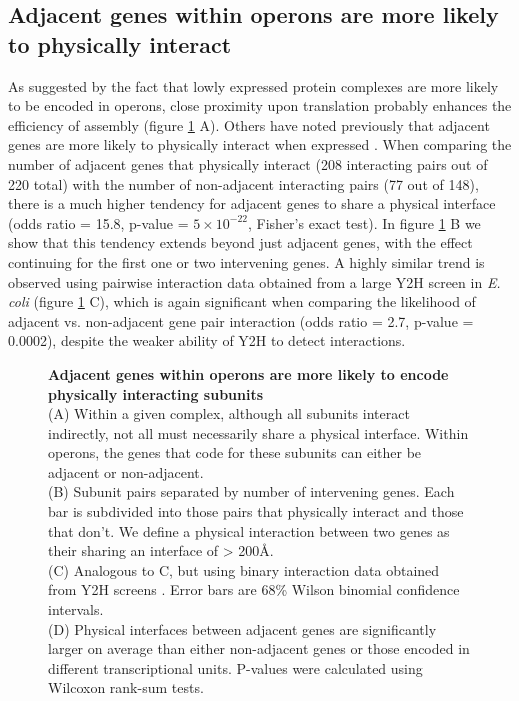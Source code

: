 \documentclass[a4paper,11pt,twoside,openright]{scrbook}
\begin{document}
\subsection{Adjacent genes within operons are more likely to physically interact}
As suggested by the fact that lowly expressed protein complexes are more likely to be encoded in operons, close proximity upon translation probably enhances the efficiency of assembly (figure \ref{figure:intervening} A). Others have noted previously that adjacent genes are more likely to physically interact when expressed \cite{}. When comparing the number of adjacent genes that physically interact (208 interacting pairs out of 220 total) with the number of non-adjacent interacting pairs (77 out of 148), there is a much higher tendency for adjacent genes to share a physical interface (odds ratio = 15.8, p-value = \(5\times10^{-22}\), Fisher's exact test). In figure \ref{figure:intervening} B we show that this tendency extends beyond just adjacent genes, with the effect continuing for the first one or two intervening genes. A highly similar trend is observed using pairwise interaction data obtained from a large Y2H screen in \textit{E. coli} \cite{Rajagopala2014} (figure \ref{figure:intervening} C), which is again significant when comparing the likelihood of adjacent vs. non-adjacent gene pair interaction (odds ratio = 2.7, p-value = 0.0002), despite the weaker ability of Y2H to detect interactions.

\begin{figure}[h]
    \caption[Adjacent genes within operons are more likely to encode physically interacting subunits]{\sffamily \textbf{Adjacent genes within operons are more likely to encode physically interacting subunits} \\ \small (A) Within a given complex, although all subunits interact indirectly, not all must necessarily share a physical interface. Within operons, the genes that code for these subunits can either be adjacent or non-adjacent.\\
    (B) Subunit pairs separated by number of intervening genes. Each bar is subdivided into those pairs that physically interact and those that don't. We define a physical interaction between two genes as their sharing an interface of > 200Å.\\
    (C) Analogous to C, but using binary interaction data obtained from Y2H screens \cite{Rajagopala2014}. Error bars are 68\% Wilson binomial confidence intervals.\\
    (D) Physical interfaces between adjacent genes are significantly larger on average than either non-adjacent genes or those encoded in different transcriptional units. P-values were calculated using Wilcoxon rank-sum tests.}
    \label{figure:intervening}
\end{figure}
\end{document}
